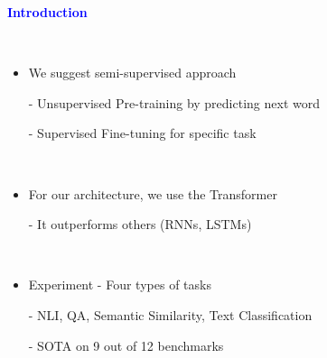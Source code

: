 \documentclass[professionalfont]{beamer}
\begin{document}
\begin{frame}
\begin{center}
    { \textbf{\textcolor{blue}{ {\fontsize{12}{14}\selectfont Introduction} }} }
\end{center}
\\[0.5cm]

{\fontsize{10}{14}\selectfont 
\begin{itemize}
    \item We suggest semi-supervised approach
    
    - Unsupervised Pre-training by predicting next word

    - Supervised Fine-tuning for specific task

    \\[0.5cm]

    \item For our architecture, we use the Transformer

    - It outperforms others (RNNs, LSTMs)

    \\[0.5cm]

    \item Experiment - Four types of tasks

    - NLI, QA, Semantic Similarity, Text Classification

    - SOTA on 9 out of 12 benchmarks
\end{itemize}
}

\end{frame}
\end{document}
